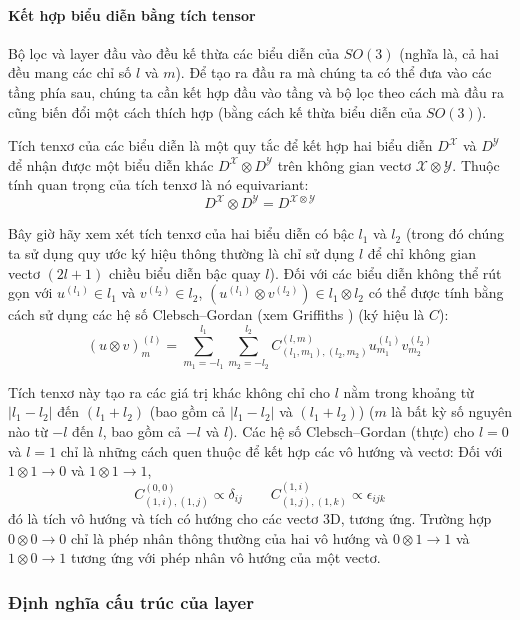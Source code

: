\paragraph{Kết hợp biểu diễn bằng tích tensor}

Bộ lọc và layer đầu vào đều kế thừa các biểu diễn của $SO(3)$ (nghĩa là, cả hai đều mang các chỉ số $l$ và $m$). Để tạo ra đầu ra mà chúng ta có thể đưa vào các tầng phía sau, chúng ta cần kết hợp đầu vào tầng và bộ lọc theo cách mà đầu ra cũng biến đổi một cách thích hợp (bằng cách kế thừa biểu diễn của $SO(3)$)\cite{thomas2018tensorfieldnetworksrotation}. 

Tích tenxơ của các biểu diễn là một quy tắc để kết hợp hai biểu diễn $D^{\mathcal{X}}$ và $D^{\mathcal{Y}}$ để nhận được một biểu diễn khác $D^{\mathcal{X}} \otimes D^{\mathcal{Y}}$ trên không gian vectơ $\mathcal{X} \otimes \mathcal{Y}$. Thuộc tính quan trọng của tích tenxơ là nó equivariant:
$$
D^{\mathcal{X}} \otimes D^{\mathcal{Y}} = D^{\mathcal{X} \otimes \mathcal{Y}}
$$

Bây giờ hãy xem xét tích tenxơ của hai biểu diễn có bậc $l_1$ và $l_2$ (trong đó chúng ta sử dụng quy ước ký hiệu thông thường là chỉ sử dụng $l$ để chỉ không gian vectơ $(2l + 1)$ chiều biểu diễn bậc quay $l$). Đối với các biểu diễn không thể rút gọn với $u^{(l_1)} \in l_1$ và $v^{(l_2)} \in l_2$, $(u^{(l_1)} \otimes v^{(l_2)}) \in l_1 \otimes l_2$ có thể được tính bằng cách sử dụng các hệ số Clebsch–Gordan (xem Griffiths \cite{Griffiths_Schroeter_2018}) (ký hiệu là $C$):
$$
(u \otimes v)^{(l)}_m = \sum_{m_1 = -l_1}^{l_1} \sum_{m_2 = -l_2}^{l_2} C^{ (l, m)}_{(l_1, m_1),(l_2, m_2)} u^{(l_1)}_{m_1} v^{(l_2)}_{m_2}
$$

Tích tenxơ này tạo ra các giá trị khác không chỉ cho $l$ nằm trong khoảng từ $|l_1 - l_2|$ đến $(l_1 + l_2)$ (bao gồm cả $|l_1 - l_2|$ và $(l_1 + l_2)$) ($m$ là bất kỳ số nguyên nào từ $-l$ đến $l$, bao gồm cả $-l$ và $l$). Các hệ số Clebsch–Gordan (thực) cho $l = 0$ và $l = 1$ chỉ là những cách quen thuộc để kết hợp các vô hướng và vectơ: Đối với $1 \otimes 1 \rightarrow 0$ và $1 \otimes 1 \rightarrow 1$, 
$$
C^{ (0, 0)}_{(1, i),(1, j)} \propto \delta_{ij}  \quad \quad  C^{ (1, i)}_{(1, j),(1, k)} \propto \epsilon_{ijk}
$$
đó là tích vô hướng và tích có hướng cho các vectơ 3D, tương ứng. Trường hợp $0 \otimes 0 \rightarrow 0$ chỉ là phép nhân thông thường của hai vô hướng và $0 \otimes 1 \rightarrow 1$ và $1 \otimes 0 \rightarrow 1$ tương ứng với phép nhân vô hướng của một vectơ. 

\subsubsection{Định nghĩa cấu trúc của layer}

